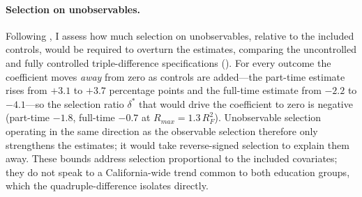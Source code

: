 \documentclass[11pt]{article}
\let\Cref\crtCref
\begin{document}

\paragraph{Selection on unobservables.} Following \cite{oster_unobservable_2019}, I assess how much selection on unobservables, relative to the included controls, would be required to overturn the estimates, comparing the uncontrolled and fully controlled triple-difference specifications (\Cref{tab:oster}). For every outcome the coefficient moves \emph{away} from zero as controls are added---the part-time estimate rises from $+3.1$ to $+3.7$ percentage points and the full-time estimate from $-2.2$ to $-4.1$---so the selection ratio $\delta^*$ that would drive the coefficient to zero is negative (part-time $-1.8$, full-time $-0.7$ at $R_{max}=1.3\,R^2_F$). Unobservable selection operating in the same direction as the observable selection therefore only strengthens the estimates; it would take reverse-signed selection to explain them away. These bounds address selection proportional to the included covariates; they do not speak to a California-wide trend common to both education groups, which the quadruple-difference isolates directly.

\begin{table}[htbp]
    \centering
    \caption{Oster (2019) coefficient-stability bounds}
    \label{tab:oster}
\end{table}
\end{document}
